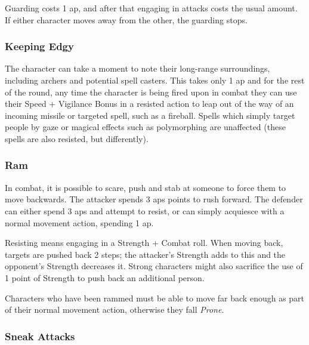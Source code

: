 \begin{multicols}{2}
Guarding costs 1 \gls{ap}, and after that engaging in attacks costs the usual amount.
If either character moves away from the other, the guarding stops.

\subsubsection[Keep Edgy: Look out for missiles and resist them with Speed + Vigilance. Cost: 1 \gls{ap}]{Keeping Edgy}
\label{edgy}

The character can take a moment to note their long-range surroundings, including archers and potential spell casters.
This takes only 1 \gls{ap} and for the rest of the round, any time the character is being fired upon in combat they can use their Speed + Vigilance Bonus in a resisted action to leap out of the way of an incoming missile or targeted spell, such as a fireball.
Spells which simply target people by gaze or magical effects such as polymorphing are unaffected (these spells are also resisted, but differently).

\subsubsection[Ram: Push the enemy back 2 steps plus the difference between your Strength Bonuses. Resisting costs 2 \glspl{ap}, and requires a resisted Strength + Combat roll. Cost: 3 \glspl{ap}]{Ram}
\label{ram}

In combat, it is possible to scare, push and stab at someone to force them to move backwards.
The attacker spends 3 \glspl{ap} points to rush forward.
The defender can either spend 3 \glspl{ap} and attempt to resist, or can simply acquiesce with a normal movement action, spending 1 \gls{ap}.

Resisting means engaging in a Strength + Combat roll.
When moving back, targets are pushed back 2 steps; the attacker's Strength adds to this and the opponent's Strength decreases it.
Strong characters might also sacrifice the use of 1 point of Strength to push back an additional person.

Characters who have been rammed must be able to move far back enough as part of their normal movement action, otherwise they fall \textit{Prone}.

\subsubsection[Sneak Attack: +2 to attack and +2 Damage. Surprised enemies cannot resist.]{Sneak Attacks}
\label{sneakattack}


\end{multicols}
